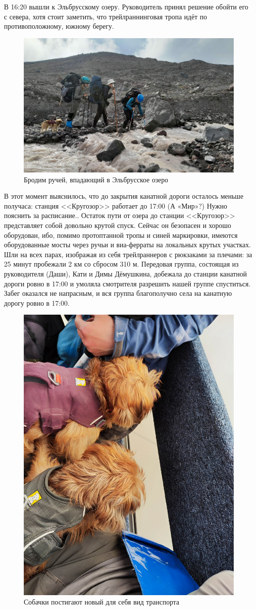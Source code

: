 В 16:20 вышли к Эльбрусскому озеру. Руководитель принял решение обойти его с севера, хотя стоит заметить, что трейлраннинговая тропа идёт по противоположному, южному берегу.

\begin{figure}[h!]
	\centering
	\includegraphics[width=0.7\linewidth]{../pics/20240830_162252.jpg}
	\caption{Бродим ручей, впадающий в Эльбрусское озеро}
	\label{fig:20240830_162252.jpg}
\end{figure}

В этот момент выяснилось, что до закрытия канатной дороги осталось меньше получаса: станция <<Кругозор>> работает до 17:00 \alert{(А «Мир»?) Нужно пояснить за расписание.}. Остаток пути от озера до станции <<Кругозор>> представляет собой довольно крутой спуск. Сейчас он безопасен и хорошо оборудован, ибо, помимо протоптанной тропы и синей маркировки, имеются оборудованные мосты через ручьи и виа-ферраты на локальных крутых участках. Шли на всех парах, изображая из себя трейлраннеров с рюкзаками за плечами: за 25 минут пробежали 2 км со сбросом 310 м. Передовая группа, состоящая из руководителя (Даши), Кати и Димы Дёмушкина, добежала до станции канатной дороги ровно в 17:00 и умоляла смотрителя разрешить нашей группе спуститься. Забег оказался не напрасным, и вся группа благополучно села на канатную дорогу ровно в 17:00. 

\begin{figure}[h!]
	\centering
	\includegraphics[width=0.4\linewidth]{../pics/IMG_20240830_170232.jpg}
	\caption{Собачки постигают новый для себя вид транспорта}
	\label{fig:IMG_20240830_170232.jpg}
\end{figure}

